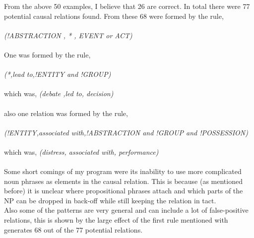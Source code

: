 \documentclass[11pt]{article}
\begin{document}
From the above 50 examples, I believe that 26 are correct. In total there were 77 potential causal relations found. From these 68 were formed by the rule,\\ \\
\small
\textit{(!ABSTRACTION ,  * , EVENT or ACT)}\\ \\
\normalsize
One was formed by the rule,\\ \\
\small
\textit{(*,lead to,!ENTITY and !GROUP)}\\ \\ \normalsize which was, \textit{(debate ,led to, decision)}\\ \\
also one relation was formed by the rule,\\ \\ \small
\textit{(!ENTITY,associated with,!ABSTRACTION and !GROUP and !POSSESSION)}\\ \\ \normalsize which was, \textit{(distress, associated with, performance)}\\ \\
Some short comings of my program were its inability to use more complicated noun phrases as elements in the causal relation. This is because (as mentioned before) it is unclear where propositional phrases attach and which parts of the NP can be dropped in back-off while still keeping the relation in tact. \\
Also some of the patterns are very general and can include a lot of false-positive relations, this is shown by the large effect of the first rule mentioned with generates 68 out of the 77 potential relations.	
\end{document}
